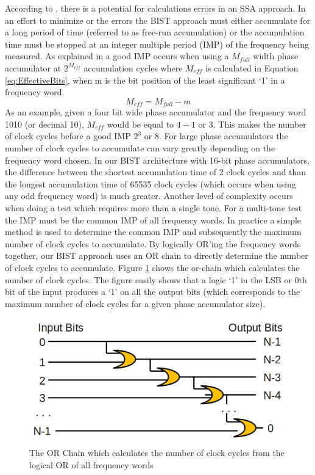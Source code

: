 \documentclass[12pt]{report}
\begin{document}
According to \cite{jie}, there is a potential for calculations errors in an SSA approach.  In an effort to minimize or the errors the BIST approach must either accumulate for a long period of time (referred to as free-run accumulation) or the accumulation time must be stopped at an integer multiple period (IMP) of the frequency being measured.  As explained in \cite{jie} a good IMP occurs when using a $M_{full}$ width phase accumulator at $2^{M_{eff}}$ accumulation cycles where $M_{eff}$ is calculated in Equation \ref{eq:EffectiveBits}, when m is the bit position of the least significant `1' in a frequency word\cite{jie}.
\begin{equation}
	M_{eff} = M_{full} - m
	\label{eq:EffectiveBits}
\end{equation}
As an example, given a four bit wide phase accumulator and the frequency word 1010 (or decimal 10), $M_{eff}$ would be equal to $4 - 1$ or 3.  This makes the number of clock cycles before a good IMP $2^3$ or $8$.  For large phase accumulators the number of clock cycles to accumulate can vary greatly depending on the frequency word chosen.  In our BIST architecture with 16-bit phase accumulators, the difference between the shortest accumulation time of 2 clock cycles and than the longest accumulation time of 65535 clock cycles (which occurs when using any odd frequency word) is much greater.  Another level of complexity occurs when doing a test which requires more than a single tone.  For a multi-tone test the IMP must be the common IMP of all frequency words.  In practice a simple method is used to determine the common IMP and subsequently the maximum number of clock cycles to accumulate.  By logically OR'ing the frequency words together, our BIST approach uses an OR chain to directly determine the number of clock cycles to accumulate.  Figure \ref{fig:or-chain} shows the or-chain which calculates the number of clock cycles.  The figure easily shows that a logic `1' in the LSB or 0th bit of the input produces a `1' on all the output bits (which corresponds to the maximum number of clock cycles for a given phase accumulator size).
\begin{figure}
	\begin{center}
		\includegraphics[scale=1]{images/or-chain}
	\end{center}
	\caption{The OR Chain which calculates the number of clock cycles from the logical OR of all frequency words}
	\label{fig:or-chain}
\end{figure}
\end{document}
